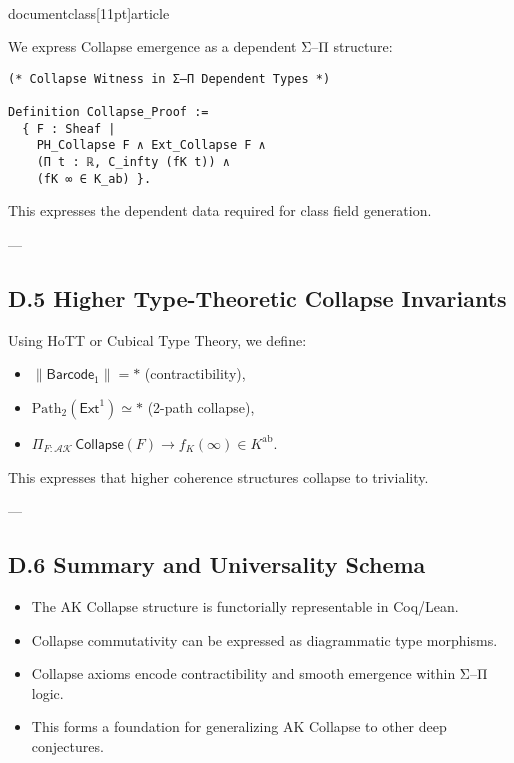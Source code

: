 \\documentclass[11pt]{article}
\begin{document}
We express Collapse emergence as a dependent Σ–Π structure:

\begin{lstlisting}[language=Coq, caption=Σ–Π Collapse Encoding]
(* Collapse Witness in Σ–Π Dependent Types *)

Definition Collapse_Proof :=
  { F : Sheaf |
    PH_Collapse F ∧ Ext_Collapse F ∧ 
    (Π t : ℝ, C_infty (fK t)) ∧ 
    (fK ∞ ∈ K_ab) }.
\end{lstlisting}

This expresses the dependent data required for class field generation.

---

\subsection*{D.5 Higher Type-Theoretic Collapse Invariants}

Using HoTT or Cubical Type Theory, we define:

\begin{itemize}
  \item \( \| \mathsf{Barcode}_1 \| = \ast \) (contractibility),
  \item \( \mathrm{Path}_2(\mathsf{Ext}^1) \simeq \ast \) (2-path collapse),
  \item \( \Pi_{F : \mathcal{AK}}\, \mathsf{Collapse}(F) \to f_K(\infty) \in K^{\mathrm{ab}} \).
\end{itemize}

This expresses that higher coherence structures collapse to triviality.

---

\subsection*{D.6 Summary and Universality Schema}

\begin{itemize}
    \item The AK Collapse structure is functorially representable in Coq/Lean.
    \item Collapse commutativity can be expressed as diagrammatic type morphisms.
    \item Collapse axioms encode contractibility and smooth emergence within Σ–Π logic.
    \item This forms a foundation for generalizing AK Collapse to other deep conjectures.
\end{itemize}
\end{document}
